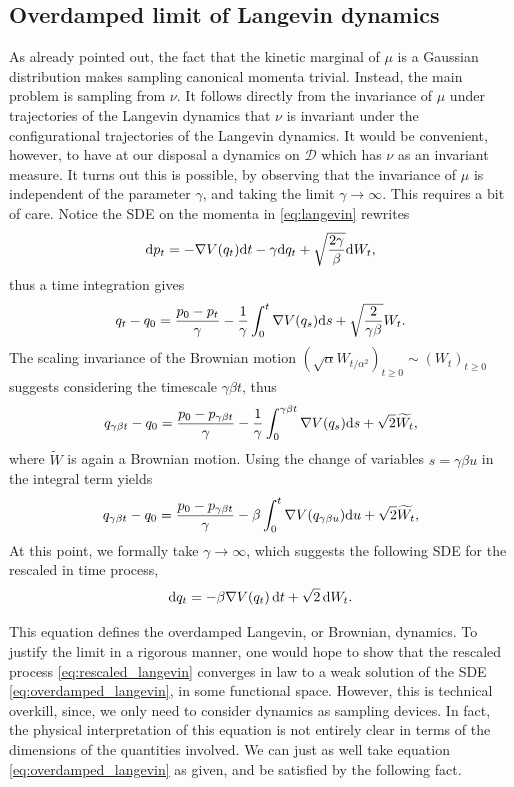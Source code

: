     \subsection{Overdamped limit of Langevin dynamics}
        As already pointed out, the fact that the kinetic marginal of $\mu$ is a Gaussian distribution makes sampling canonical momenta trivial. 
        Instead, the main problem is sampling from $\nu$. It follows directly from the invariance of $\mu$ under trajectories of the Langevin dynamics that $\nu$ is invariant under the configurational trajectories of the Langevin dynamics.
        It would be convenient, however, to have at our disposal a dynamics on $\mathcal D$ which has $\nu$ as an invariant measure.
        It turns out this is possible, by observing that the invariance of $\mu$ is independent of the parameter $\gamma$, and taking the limit $\gamma\to\infty$. This requires a bit of care.
        Notice the SDE on the momenta in \eqref{eq:langevin} rewrites 
        \[\mathrm{d} p_t=-\nabla V(q_t)\mathrm{d} t-\gamma \mathrm{d} q_t+\sqrt{\frac{2\gamma}\beta}\mathrm{d} W_t,\]
        thus a time integration gives
        \[q_t-q_0=\frac{p_0-p_t}\gamma -\frac{1}\gamma\int_0^t\nabla V(q_s)\mathrm{d} s +\sqrt{\frac{2}{\gamma\beta}}W_t.\]
        The scaling invariance of the Brownian motion $(\sqrt{\alpha}W_{t/\alpha^2})_{t\geq 0}\sim (W_t)_{t\geq 0}$ suggests considering the timescale $\gamma\beta t$, thus
        \[q_{\gamma\beta t}-q_0=\frac{p_0-p_{\gamma\beta t}}\gamma-\frac1{\gamma}\int_0^{\gamma\beta t}\nabla V(q_s)\mathrm{d} s +\sqrt{2}\widetilde{W_t},\]
        where $\widetilde W$ is again a Brownian motion. Using the change of variables $s=\gamma \beta u$ in the integral term yields
        \begin{equation}\label{eq:rescaled_langevin}q_{\gamma\beta t}-q_0=\frac{p_0-p_{\gamma\beta t}}\gamma-\beta\int_0^{t}\nabla V(q_{\gamma\beta u})\mathrm{d} u +\sqrt{2}\widetilde{W_t},\end{equation}
        At this point, we formally take $\gamma\to\infty$, which suggests the following SDE for the rescaled in time process,
        \begin{equation}
            \label{eq:overdamped_langevin}
            \mathrm{d} q_t=-\beta \nabla V(q_t)\,\mathrm{d} t+\sqrt{2}\,\mathrm{d} W_t.
        \end{equation}
        
        This equation defines the overdamped Langevin, or Brownian, dynamics.
        To justify the limit in a rigorous manner, one would hope to show that the rescaled process \eqref{eq:rescaled_langevin} converges in law to a weak solution of the SDE \eqref{eq:overdamped_langevin}, in some functional space.
        However, this is technical overkill, since, we only need to consider dynamics as sampling devices. In fact, the physical interpretation of this equation is not entirely clear in terms of the dimensions of the quantities involved.
        We can just as well take equation \eqref{eq:overdamped_langevin} as given, and be satisfied by the following fact.
    
